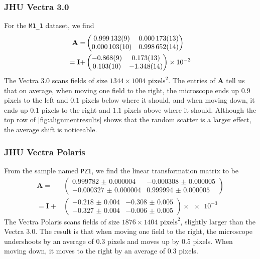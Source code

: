 \documentclass{article}
\newcommand{\matrixbold}[1]{\mathbf{#1}}
\newcommand{\M}[2]{\texttt{M#1\_#2}}
\begin{document}
\subsubsection{JHU Vectra 3.0}

For the \M11 dataset, we find
\begin{align}
\matrixbold{A}=&\begin{pmatrix}
\num{0.999132\pm.000009} &
\num{.000173\pm.000013} \\
\num{0.000103\pm.000010} &
\num{0.998652\pm.000014}
\end{pmatrix} \\
=\matrixbold{I} + &\begin{pmatrix}
\num{-0.868\pm.009} &
\num{.173\pm.013} \\
\num{0.103\pm.010} &
\num{-1.348\pm.014}
\end{pmatrix} \times \num{e-3}
\label{eq:Amatrix_M11}
\end{align}
The Vectra 3.0 scans fields of size $1344\times1004$ $\text{pixels}^2$.  The entries of $\matrixbold{A}$ tell us that on average, when moving one field to the right, the microscope ends up $0.9$ pixels to the left and $0.1$ pixels below where it should, and when moving down, it ends up $0.1$ pixels to the right and $1.1$ pixels above where it should.  Although the top row of \cref{fig:alignmentresults} shows that the random scatter is a larger effect, the average shift is noticeable.

\subsubsection{JHU Vectra Polaris}

From the sample named \texttt{PZ1}, we find the linear transformation matrix to be
\begin{align}
\matrixbold{A}=&\begin{pmatrix}
\num{0.999782(4)} &
\num{-0.000308(5)} \\
\num{-0.000327(4)} &
\num{0.999994(5)}
\end{pmatrix} \\
=\matrixbold{I} + &\begin{pmatrix}
\num{-0.218(4)} &
\num{-0.308(5)} \\
\num{-0.327(4)} &
\num{-0.006(5)}
\end{pmatrix} \times \num{e-3}
\label{eq:Amatrix_PZ1}
\end{align}
The Vectra Polaris scans fields of size $1876\times1404$ $\text{pixels}^2$, slightly larger than the Vectra 3.0.  The result is that when moving one field to the right, the microscope undershoots by an average of $0.3$ pixels and moves up by $0.5$ pixels.  When moving down, it moves to the right by an average of $0.3$ pixels.
\end{document}
